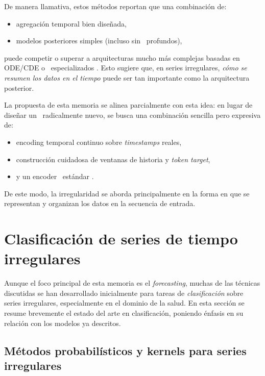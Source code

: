 \hfill

De manera llamativa, estos métodos reportan que una combinación de:
\begin{itemize}
    \item agregación temporal bien diseñada,
    \item modelos posteriores simples (incluso sin \Transformers\ profundos),
\end{itemize}
puede competir o superar a arquitecturas mucho más complejas basadas en ODE/CDE o \Transformers\ especializados \cite{liu2025rethinking}. Esto sugiere que, en series irregulares, \textit{cómo se resumen los datos en el tiempo} puede ser tan importante como la arquitectura posterior.

\hfill

La propuesta de esta memoria se alinea parcialmente con esta idea: en lugar de diseñar un \Transformer\ radicalmente nuevo, se busca una combinación sencilla pero expresiva de:
\begin{itemize}
    \item encoding temporal continuo sobre \emph{timestamps} reales,
    \item construcción cuidadosa de ventanas de historia y \emph{token target},
    \item y un encoder \Transformer\ estándar \cite{vaswani2017attention}.
\end{itemize}
De este modo, la irregularidad se aborda principalmente en la forma en que se representan y organizan los datos en la secuencia de entrada.

\section{Clasificación de series de tiempo irregulares}
\label{sec:estado-arte-clasificacion}

Aunque el foco principal de esta memoria es el \emph{forecasting}, muchas de las técnicas discutidas se han desarrollado inicialmente para tareas de \textit{clasificación} sobre series irregulares, especialmente en el dominio de la salud. En esta sección se resume brevemente el estado del arte en clasificación, poniendo énfasis en su relación con los modelos ya descritos.

\subsection{Métodos probabilísticos y kernels para series irregulares}

